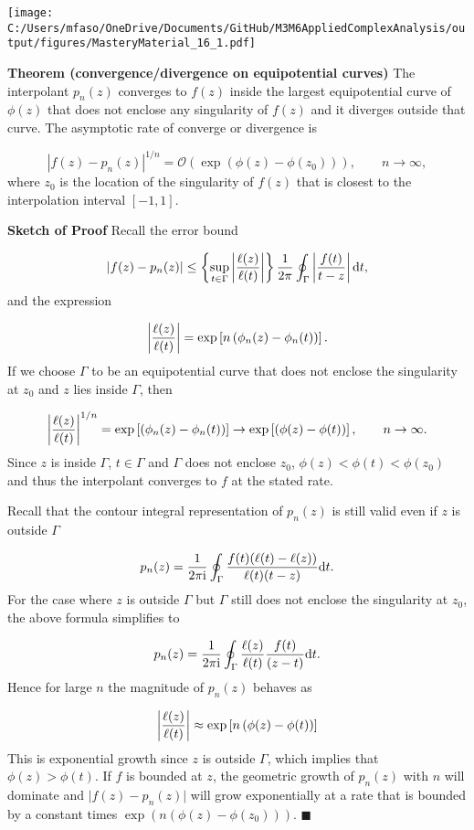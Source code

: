 \documentclass[12pt,a4paper]{article}
\def\D{ {\rm d} }
\def\I{ {\rm i} }
\def\dt{\D t}
\begin{document}
\texttt{[image: C:/Users/mfaso/OneDrive/Documents/GitHub/M3M6AppliedComplexAnalysis/output/figures/MasteryMaterial\_16\_1.pdf]}

\textbf{Theorem (convergence/divergence on equipotential curves)} The interpolant $p_n(z)$ converges to $f(z)$ inside the largest equipotential curve of $\phi(z)$ that does not enclose any singularity of $f(z)$ and it diverges outside that curve. The asymptotic rate of converge or divergence is

\[
\left\vert f(z) - p_n(z)  \right\vert^{1/n} = \mathcal{O}\left( \exp\left(\phi(z) - \phi(z_0) \right)\right), \qquad n \to \infty,
\]
where $z_0$ is the location of the singularity of $f(z)$ that is closest to the interpolation interval $[-1, 1]$.

\textbf{Sketch of Proof} Recall the error bound

\[
\vert f(z) - p_n(z) \vert \leq  \left\lbrace\sup_{t \in \Gamma} \left\vert {\ell(z)\over\ell(t)} \right\vert\right\rbrace {1 \over 2\pi}  \oint_{\Gamma} \left\vert{f(t)\over t-z} \right\vert \dt,
\]
and the expression

\[
\left\vert {\ell(z)\over\ell(t)} \right\vert =  \exp\left[ n\left(\phi_n(z) - \phi_n(t) \right) \right].
\]
If we choose $\Gamma$ to be an equipotential curve that does not enclose the singularity at $z_0$ and $z$ lies inside $\Gamma$, then

\[
\left\vert {\ell(z)\over\ell(t)} \right\vert^{1/n} =  \exp\left[ \left(\phi_n(z) - \phi_n(t) \right) \right] \to \exp\left[ \left(\phi(z) - \phi(t) \right) \right], \qquad n\to \infty.
\]
Since $z$ is inside $\Gamma$, $t\in \Gamma$ and $\Gamma$ does not enclose $z_0$, $\phi(z) < \phi(t) < \phi(z_0)$ and thus the interpolant converges to $f$ at the stated rate.

Recall that the contour integral representation of $p_n(z)$ is still valid even if $z$ is outside $\Gamma$

\[
p_n(z) = {1 \over 2\pi\I} \oint_{\Gamma} {f(t)(\ell(t) - \ell(z))\over \ell(t)(t - z)}\dt.
\]
For the case where $z$ is outside $\Gamma$ but $\Gamma$ still does not enclose the singularity at $z_0$, the above formula simplifies to

\[
p_n(z) = {1 \over 2\pi\I} \oint_{\Gamma} {\ell(z)\over\ell(t)}   {f(t)\over(z - t)}\dt.
\]
Hence for large $n$ the magnitude of $p_n(z)$ behaves as

\[
\left\vert {\ell(z)\over\ell(t)} \right\vert \approx \exp\left[ n\left(\phi(z) - \phi(t) \right) \right]
\]
This is exponential growth since $z$ is outside $\Gamma$, which implies that $\phi(z) > \phi(t)$. If $f$ is bounded at $z$, the geometric growth of $p_n(z)$ with $n$ will dominate and $\vert f(z) - p_n(z) \vert$ will grow exponentially at a rate that is bounded by a constant times $\exp\left(n(\phi(z) - \phi(z_0)) \right)$. \ensuremath{\blacksquare}
\end{document}
